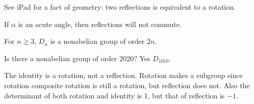\documentclass[class=article,crop=false]{standalone}
\begin{document}
See iPad for a fact of geometry: two reflections is equivalent to a rotation.

\begin{claim}[]
If $ \alpha$ is an acute angle, then reflections will not commute.
\end{claim}

\begin{thm}[]
For $n \geq 3 $,  $ D_n$ is a nonabelian group of  order $ 2n$.
\end{thm}

Is there a nonabelian group of order $ 2020$? Yes  $ D_{1010}$.

\begin{claim}[]
The identity is a rotation, not a reflection. Rotation makes a subgroup since rotation composite rotation is still a rotation, but reflection does not. Also the determinant of both rotation and identity is 1, but that of reflection is $ -1$.
\end{claim}
\end{document}
